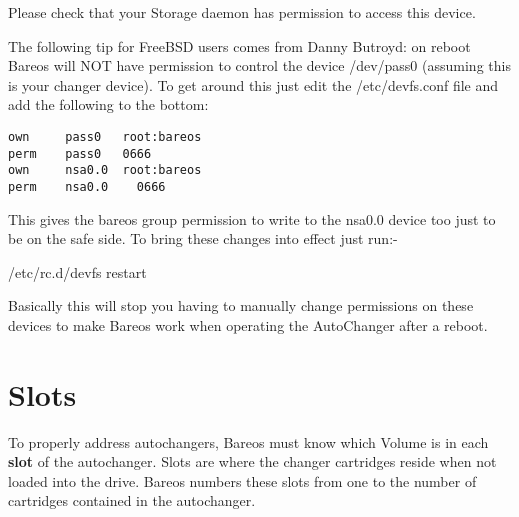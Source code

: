 Please check that your Storage daemon has permission to access this
device.

The following tip for FreeBSD users comes from Danny Butroyd:
on reboot Bareos will NOT have permission to
control the device /dev/pass0 (assuming this is your changer device).
To get around this just edit the /etc/devfs.conf file and add the
following to the bottom:
\footnotesize
\begin{verbatim}
own     pass0   root:bareos
perm    pass0   0666
own     nsa0.0  root:bareos
perm    nsa0.0    0666
\end{verbatim}
\normalsize

This gives the bareos group permission to write to the nsa0.0 device
too just to be on the safe side.   To bring these changes into effect
just run:-

/etc/rc.d/devfs restart

Basically this will stop you having to manually change permissions on these
devices to make Bareos work when operating the AutoChanger after a reboot.

%


\section{Slots}
\label{Slots}

To properly address autochangers, Bareos must know which Volume is in each
{\bf slot} of the autochanger. Slots are where the changer cartridges reside
when not loaded into the drive. Bareos numbers these slots from one to the
number of cartridges contained in the autochanger.


